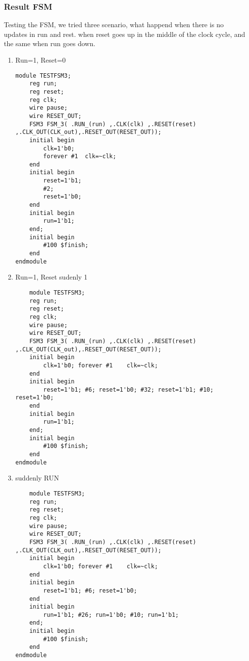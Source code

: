 \subsubsection{Result FSM}
Testing the FSM, we tried three scenario, what happend when there is no updates in run and rest. when reset goes up in the middle of the clock cycle, and the same when run goes down.

\begin{enumerate}
    \item Run=1, Reset=0
    \begin{lstlisting}
module TESTFSM3;
	reg run;
	reg reset;
	reg clk;
	wire pause; 
	wire RESET_OUT;	
	FSM3 FSM_3( .RUN_(run) ,.CLK(clk) ,.RESET(reset) ,.CLK_OUT(CLK_out),.RESET_OUT(RESET_OUT));	
	initial begin
		clk=1'b0;
		forever #1	clk=~clk;
	end
	initial begin
		reset=1'b1;
		#2;
		reset=1'b0;	
	end	
	initial begin
		run=1'b1;	
	end;
	initial begin
		#100 $finish;
	end
endmodule
    \end{lstlisting}

    
    \item Run=1, Reset sudenly 1
\begin{lstlisting} 
    module TESTFSM3;
	reg run;
	reg reset;
	reg clk;
	wire pause; 
	wire RESET_OUT;	
	FSM3 FSM_3( .RUN_(run) ,.CLK(clk) ,.RESET(reset) ,.CLK_OUT(CLK_out),.RESET_OUT(RESET_OUT));	
	initial begin
		clk=1'b0; forever #1	clk=~clk;
	end
	initial begin
		reset=1'b1; #6; reset=1'b0; #32; reset=1'b1; #10; reset=1'b0;
	end	
	initial begin
		run=1'b1;	
	end;
	initial begin
		#100 $finish;
	end
endmodule
\end{lstlisting}
\item suddenly RUN
\begin{lstlisting} 
    module TESTFSM3;
	reg run;
	reg reset;
	reg clk;
	wire pause; 
	wire RESET_OUT;	
	FSM3 FSM_3( .RUN_(run) ,.CLK(clk) ,.RESET(reset) ,.CLK_OUT(CLK_out),.RESET_OUT(RESET_OUT));	
	initial begin
		clk=1'b0; forever #1	clk=~clk;
	end
	initial begin
		reset=1'b1; #6; reset=1'b0; 
	end	
	initial begin
		run=1'b1; #26; run=1'b0; #10; run=1'b1;	
	end;
	initial begin
		#100 $finish;
	end
endmodule
\end{lstlisting}
\end{enumerate}